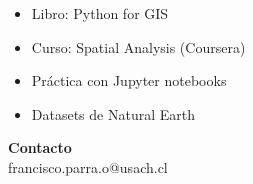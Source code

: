 \documentclass[11pt,a4paper]{article}
\begin{document}
\begin{itemize}[leftmargin=*]
    \item Libro: Python for GIS
    \item Curso: Spatial Analysis (Coursera)
    \item Práctica con Jupyter notebooks
    \item Datasets de Natural Earth
\end{itemize}


\vspace{0.5cm}

\begin{tcolorbox}[colback=gray!10,colframe=gray!50]
\centering
\textbf{Contacto}\\[0.2cm]
 francisco.parra.o@usach.cl
\end{tcolorbox}
\end{document}
